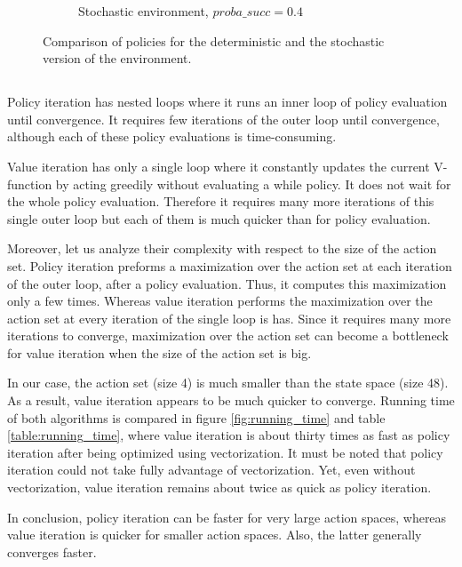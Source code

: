 \documentclass[a4paper]{article}
\begin{document}
\begin{figure}[h!]
\begin{subfigure}[b]{0.3\textwidth}
		\caption{Stochastic environment, $proba\_succ = 0.4$}
	\end{subfigure}
	\caption{Comparison of policies for the deterministic and the stochastic version of the environment.}
	\label{fig:policies}
\end{figure}


\subsection{}

Policy iteration has nested loops where it runs an inner loop of policy evaluation until convergence. It requires few iterations of the outer loop until convergence, although each of these policy evaluations is time-consuming.

Value iteration has only a single loop where it constantly updates the current V-function by acting greedily without evaluating a while policy. It does not wait for the whole policy evaluation. Therefore it requires many more iterations of this single outer loop but each of them is much quicker than for policy evaluation.

Moreover, let us analyze their complexity with respect to the size of the action set. Policy iteration preforms a maximization over the action set at each iteration of the outer loop, after a policy evaluation. Thus, it computes this maximization only a few times. Whereas value iteration performs the maximization over the action set at every iteration of the single loop is has. Since it requires many more iterations to converge, maximization over the action set can become a bottleneck for value iteration when the size of the action set is big.

In our case, the action set (size 4) is much smaller than the state space (size 48). As a result, value iteration appears to be much quicker to converge. Running time of both algorithms is compared in figure \ref{fig:running_time} and table \ref{table:running_time}, where value iteration is about thirty times as fast as policy iteration after being optimized using vectorization. It must be noted that policy iteration could not take fully advantage of vectorization. Yet, even without vectorization, value iteration remains about twice as quick as policy iteration.

In conclusion, policy iteration can be faster for very large action spaces, whereas value iteration is quicker for smaller action spaces. Also, the latter generally converges faster.
\end{document}

